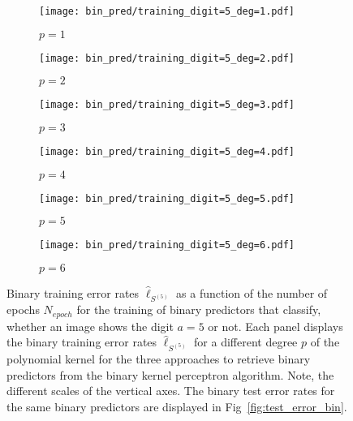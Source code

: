 \begin{figure}[h!]
    \begin{subfigure}[t]{0.49\textwidth}
        \centering
        \texttt{[image: bin\_pred/training\_digit=5\_deg=1.pdf]} 
        \caption{$p = 1$}
    \end{subfigure}
    \hfill
    \begin{subfigure}[t]{0.49\textwidth}
        \centering
        \texttt{[image: bin\_pred/training\_digit=5\_deg=2.pdf]} 
        \caption{$p = 2$}
    \end{subfigure}
    \par\bigskip
        \begin{subfigure}[t]{0.49\textwidth}
        \centering
        \texttt{[image: bin\_pred/training\_digit=5\_deg=3.pdf]} 
        \caption{$p = 3$}
    \end{subfigure}
    \hfill
    \begin{subfigure}[t]{0.49\textwidth}
        \centering
        \texttt{[image: bin\_pred/training\_digit=5\_deg=4.pdf]} 
        \caption{$p = 4$}
    \end{subfigure}
    \par\bigskip
        \begin{subfigure}[t]{0.49\textwidth}
        \centering
        \texttt{[image: bin\_pred/training\_digit=5\_deg=5.pdf]} 
        \caption{$p = 5$}
    \end{subfigure}
    \hfill
    \begin{subfigure}[t]{0.49\textwidth}
        \centering
        \texttt{[image: bin\_pred/training\_digit=5\_deg=6.pdf]} 
        \caption{$p = 6$}
    \end{subfigure}
    \caption{Binary training error rates $\hat{\ell}_{S^{(5)}}$ as a function of the number of epochs $N_{epoch}$ for the training of binary predictors that classify, whether an image shows the digit $a=5$ or not. Each panel displays the binary training error rates $\hat{\ell}_{S^{(5)}}$ for a different degree $p$ of the polynomial kernel for the three approaches to retrieve binary predictors from the binary kernel perceptron algorithm. Note, the different scales of the vertical axes. The binary test error rates for the same binary predictors are displayed in Fig~\ref{fig:test_error_bin}.}\label{fig:train_error_bin}
\end{figure}


